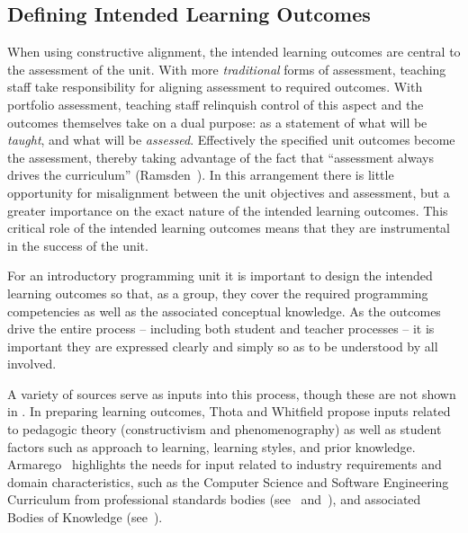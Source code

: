 \subsection{Defining Intended Learning Outcomes} %
\label{sub:defining_intended_learning_outcomes}

When using constructive alignment, the intended learning outcomes are central to the assessment of the unit. With more \emph{traditional} forms of assessment, teaching staff take responsibility for aligning assessment to required outcomes. With portfolio assessment, teaching staff relinquish control of this aspect and the outcomes themselves take on a dual purpose: as a statement of what will be \emph{taught}, and what will be \emph{assessed}. Effectively the specified unit outcomes become the assessment, thereby taking advantage of the fact that ``assessment always drives the curriculum'' (Ramsden~\cite{Ramsden:1992}).  In this arrangement there is little opportunity for misalignment between the unit objectives and assessment, but a greater importance on the exact nature of the intended learning outcomes. This critical role of the intended learning outcomes means that they are instrumental in the success of the unit. 

For an introductory programming unit it is important to design the intended learning outcomes so that, as a group, they cover the required programming competencies as well as the associated conceptual knowledge. As the outcomes drive the entire process -- including both student and teacher processes -- it is important they are expressed clearly and simply so as to be understood by all involved.

A variety of sources serve as inputs into this process, though these are not shown in . In preparing learning outcomes, Thota and Whitfield propose inputs related to pedagogic theory (constructivism and phenomenography) as well as student factors such as approach to learning, learning styles, and prior knowledge. Armarego~\cite{Armarego:2009} highlights the needs for input related to industry requirements and domain characteristics, such as the Computer Science and Software Engineering Curriculum from professional standards bodies (see~\cite{Lethbridge:2006} and~\cite{Cassel:2008}), and associated Bodies of Knowledge (see~\cite{Abran:2001}).

